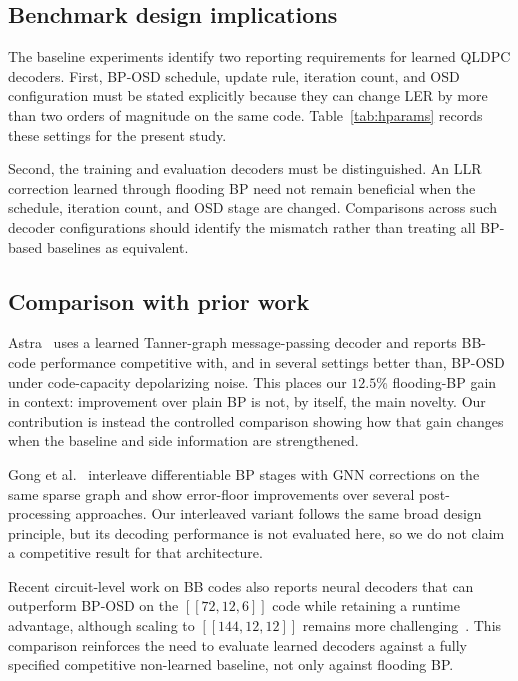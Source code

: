 \documentclass[a4paper,twocolumn,11pt,nopdfoutputerror]{quantumarticle}
\newcommand{\code}[3]{\ensuremath{[\![#1,#2,#3]\!]}}
\begin{document}
\subsection{Benchmark design implications}

The baseline experiments identify two reporting requirements for learned
QLDPC decoders. First, BP-OSD schedule, update rule, iteration count, and
OSD configuration must be stated explicitly because they can change LER
by more than two orders of magnitude on the same code. Table~\ref{tab:hparams}
records these settings for the present study.

Second, the training and evaluation decoders must be distinguished. An
LLR correction learned through flooding BP need not remain beneficial
when the schedule, iteration count, and OSD stage are changed. Comparisons
across such decoder configurations should identify the mismatch rather
than treating all BP-based baselines as equivalent.

\subsection{Comparison with prior work}\label{sec:priorwork}

Astra~\cite{Maan2025MLBP} uses a learned Tanner-graph message-passing
decoder and reports BB-code performance competitive with, and in several
settings better than, BP-OSD under code-capacity depolarizing noise. This
places our $12.5\%$ flooding-BP gain in context: improvement over plain BP
is not, by itself, the main novelty. Our contribution is instead the
controlled comparison showing how that gain changes when the baseline
and side information are strengthened.

Gong et al.~\cite{Gong2024GNN} interleave differentiable BP stages with
GNN corrections on the same sparse graph and show error-floor
improvements over several post-processing approaches. Our interleaved
variant follows the same broad design principle, but its decoding
performance is not evaluated here, so we do not claim a competitive
result for that architecture.

Recent circuit-level work on BB codes also reports neural decoders that
can outperform BP-OSD on the $\code{72}{12}{6}$ code while retaining a
runtime advantage, although scaling to $\code{144}{12}{12}$ remains more
challenging~\cite{Blue2026MLBB}. This comparison reinforces the need to evaluate learned decoders against
a fully specified competitive non-learned baseline, not only against
flooding BP.
\end{document}
